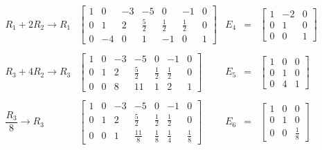 \begin{enumerate}[\bfseries 1.]
$$\begin{array}{rlrcl}
	    R_1+2R_2\to R_1&
	    \left[
		\begin{array}{rrrr|rrr}
		    1 & 0 & -3 & -5 & 0 & -1 & 0 \\
		    0 & 1 & 2 & \frac{5}{2} & \frac{1}{2} & \frac{1}{2} & 0 \\
		    0 & -4 & 0 & 1 & -1 & 0 & 1
		\end{array}
	    \right]
	    &E_4&=&
	    \left[
		\begin{array}{rrr}
		    1&-2&0\\
		    0&1&0\\
		    0&0&1
		\end{array}
	    \right]\\\\
	    R_3+4R_2\to R_3&
	    \left[
		\begin{array}{rrrr|rrr}
		    1 & 0 & -3 & -5 & 0 & -1 & 0 \\
		    0 & 1 & 2 & \frac{5}{2} & \frac{1}{2} & \frac{1}{2} & 0 \\
		    0 & 0 & 8 & 11& 1& 2 & 1
		\end{array}
	    \right]
	    &E_5&=&
	    \left[
		\begin{array}{rrr}
		    1&0&0\\
		    0&1&0\\
		    0&4&1
		\end{array}
	    \right]\\\\
	    \dfrac{R_3}{8}\to R_3&
	    \left[
		\begin{array}{rrrr|rrr}
		    1 & 0 & -3 & -5 & 0 & -1 & 0 \\
		    0 & 1 & 2 & \frac{5}{2} & \frac{1}{2} & \frac{1}{2} & 0 \\
		    0 & 0 & 1 & \frac{11}{8} & \frac{1}{8} & \frac{1}{4} & \frac{1}{8}
		\end{array}
	    \right]
	    &E_6&=&
	    \left[
		\begin{array}{rrr}
		    1&0&0\\
		    0&1&0\\
		    0&0&\frac{1}{8}
		\end{array}
	    \right]\\\\

	\end{array}
	$$


\end{enumerate}

